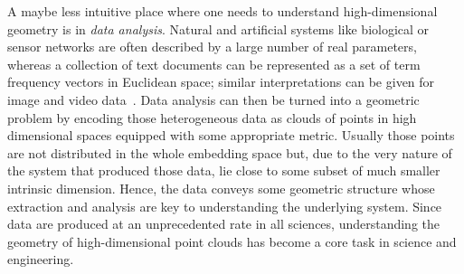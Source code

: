 A maybe less intuitive place where one needs to understand  high-dimensional geometry is in {\em data analysis}. Natural and artificial systems like biological or sensor networks are often described by a large number of real parameters, whereas a collection of text documents can be represented as a set of term frequency vectors in Euclidean space; similar interpretations can be given for image and video data~\cite{sl-mwp-2000}.  Data analysis can then be turned into a geometric problem by encoding those heterogeneous data as clouds of points in high dimensional spaces equipped with some appropriate metric. Usually those points are not distributed in the whole embedding space but, due to the very nature of the system that produced those data, lie close to some subset of much smaller intrinsic dimension. Hence, the data conveys some geometric structure whose extraction and analysis are key to understanding the underlying system.
Since data are produced at an unprecedented rate in all sciences, 
understanding the geometry of high-dimensional point clouds has become a core task in science and engineering. 








